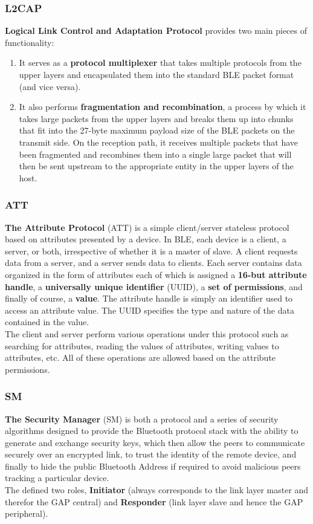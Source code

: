 \subsubsection{L2CAP}
\textbf{Logical Link Control and Adaptation Protocol} provides two main pieces of functionality:
\begin{enumerate}
	\item It serves as a \textbf{protocol multiplexer} that takes multiple protocols from the upper layers and encapsulated them into the standard BLE packet format (and vice versa).
	\item It also performs \textbf{fragmentation and recombination}, a process by which it takes large packets from the upper layers and breaks them up into chunks that fit into the 27-byte maximum payload size of the BLE packets on the transmit side. On the reception path, it receives multiple packets that have been fragmented and recombines them into a single large packet that will then be sent upstream to the appropriate entity in the upper layers of the host.
\end{enumerate}
\subsubsection{ATT}
\textbf{The Attribute Protocol} (ATT) is a simple client/server stateless protocol based on attributes presented by a device. In BLE, each device is a client, a server, or both, irrespective of whether it is a master of slave. A client requests data from a server, and a server sends data to clients. Each server contains data organized in the form of attributes each of which is assigned a \textbf{16-but attribute handle}, a \textbf{universally unique identifier} (UUID), a \textbf{set of permissions}, and finally of course, a \textbf{value}. The attribute handle is simply an identifier used to access an attribute value. The UUID specifies the type and nature of the data contained in the value. \\
The client and server perform various operations under this protocol such as searching for attributes, reading the values of attributes, writing values to attributes, etc. All of these operations are allowed based on the attribute permissions.
\subsubsection{SM}
\textbf{The Security Manager} (SM) is both a protocol and a series of security algorithms designed to provide the Bluetooth protocol stack with the ability to generate and exchange security keys, which then allow the peers to communicate securely over an encrypted link, to trust the identity of the remote device, and finally to hide the public Bluetooth Address if required to avoid malicious peers tracking a particular device.\\
The defined two roles, \textbf{Initiator} (always corresponds to the link layer master and therefor the GAP central) and \textbf{Responder} (link layer slave and hence the GAP peripheral).
